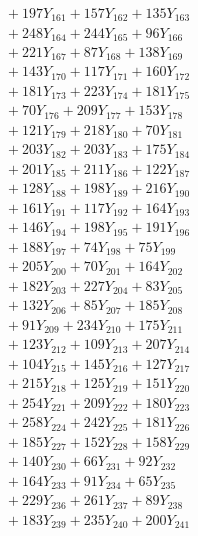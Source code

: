 \documentclass[a4paper,10pt]{article}
\begin{document}
{\begin{align}
&\;  + 197 Y_{161} + 157 Y_{162} + 135 Y_{163} \\[0.3ex]
&\;  + 248 Y_{164} + 244 Y_{165} + 96 Y_{166} \\[0.3ex]
&\;  + 221 Y_{167} + 87 Y_{168} + 138 Y_{169} \\[0.3ex]
&\;  + 143 Y_{170} + 117 Y_{171} + 160 Y_{172} \\[0.3ex]
&\;  + 181 Y_{173} + 223 Y_{174} + 181 Y_{175} \\[0.3ex]
&\;  + 70 Y_{176} + 209 Y_{177} + 153 Y_{178} \\[0.5ex]\allowbreak
&\;  + 121 Y_{179} + 218 Y_{180} + 70 Y_{181} \\[0.3ex]
&\;  + 203 Y_{182} + 203 Y_{183} + 175 Y_{184} \\[0.3ex]
&\;  + 201 Y_{185} + 211 Y_{186} + 122 Y_{187} \\[0.3ex]
&\;  + 128 Y_{188} + 198 Y_{189} + 216 Y_{190} \\[0.3ex]
&\;  + 161 Y_{191} + 117 Y_{192} + 164 Y_{193} \\[0.3ex]
&\;  + 146 Y_{194} + 198 Y_{195} + 191 Y_{196} \\[0.3ex]
&\;  + 188 Y_{197} + 74 Y_{198} + 75 Y_{199} \\[0.3ex]
&\;  + 205 Y_{200} + 70 Y_{201} + 164 Y_{202} \\[0.3ex]
&\;  + 182 Y_{203} + 227 Y_{204} + 83 Y_{205} \\[0.3ex]
&\;  + 132 Y_{206} + 85 Y_{207} + 185 Y_{208} \\[0.5ex]\allowbreak
&\;  + 91 Y_{209} + 234 Y_{210} + 175 Y_{211} \\[0.3ex]
&\;  + 123 Y_{212} + 109 Y_{213} + 207 Y_{214} \\[0.3ex]
&\;  + 104 Y_{215} + 145 Y_{216} + 127 Y_{217} \\[0.3ex]
&\;  + 215 Y_{218} + 125 Y_{219} + 151 Y_{220} \\[0.3ex]
&\;  + 254 Y_{221} + 209 Y_{222} + 180 Y_{223} \\[0.3ex]
&\;  + 258 Y_{224} + 242 Y_{225} + 181 Y_{226} \\[0.3ex]
&\;  + 185 Y_{227} + 152 Y_{228} + 158 Y_{229} \\[0.3ex]
&\;  + 140 Y_{230} + 66 Y_{231} + 92 Y_{232} \\[0.3ex]
&\;  + 164 Y_{233} + 91 Y_{234} + 65 Y_{235} \\[0.3ex]
&\;  + 229 Y_{236} + 261 Y_{237} + 89 Y_{238} \\[0.5ex]\allowbreak
&\;  + 183 Y_{239} + 235 Y_{240} + 200 Y_{241} \\[0.3ex]

\end{align}}
\end{document}
